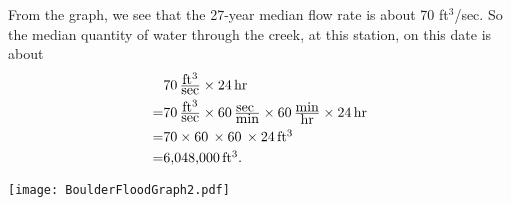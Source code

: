 \documentclass[12pt]{article}
\def\Red{\color{red}}
\def\Black{\color{black}}
\def\Red{\color{white}}
\def\Black{\color{black}}
\begin{document}
\begin{enumerate}[(a)]
\Red From the graph, we see that the 27-year median flow rate is about 70  ft$^3$/sec.  So the median quantity of water through the creek, at this station, on this date is about
\begin{align*}& 70\,  {\textstyle\frac{\hbox{ft$^3$}}{\hbox{sec}}}\times  24\,  \hbox{hr} \\=& 70\,  {\textstyle\frac{\hbox{ft$^3$}}{\hbox{sec}}}\times 60\,  {\textstyle\frac{\hbox{sec }}{\hbox{min}}}\times 60\,  {\textstyle\frac{\hbox{min}}{\hbox{hr}}}\times  24\,  \hbox{hr}
\\=& 70\times 60\,   \times 60\, \times  24 \, \hbox{ft$^3$} 
\\=& \hbox{6,048,000}\, \hbox{ft$^3$.} \end{align*} \Black

\vfill
\end{enumerate}
\newpage

\begin{center}
\texttt{[image: BoulderFloodGraph2.pdf]}
\end{center}
\end{document}
